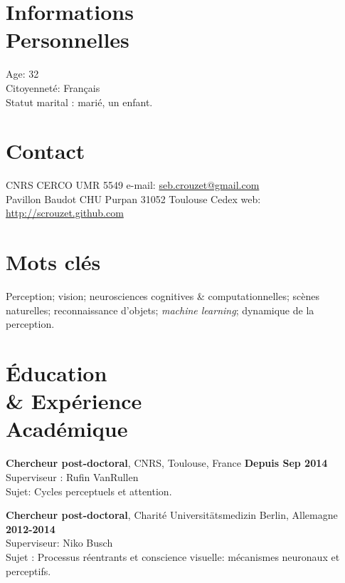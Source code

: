 \documentclass[margin,line]{resume}
\begin{document}
\begin{resume}

\section{\mysidestyle Informations\\Personnelles}
    Age: 32\\
    Citoyenneté: Français\\
    Statut marital : marié, un enfant.

\vspace{3mm}
\section{\mysidestyle Contact}
CNRS CERCO UMR 5549             \hfill e-mail: \href{mailto:seb.crouzet@gmail.com}{seb.crouzet@gmail.com} \\
Pavillon Baudot CHU Purpan 31052 Toulouse Cedex      \hfill web: \url{http://scrouzet.github.com} 
    

\vspace{3mm}
\section{\mysidestyle Mots clés}
    Perception; vision; neurosciences cognitives \& computationnelles; scènes naturelles; reconnaissance d'objets; \emph{machine learning}; dynamique de la perception.
    
\vspace{3mm}
\section{\mysidestyle \'Education \\ \& Expérience \\ Académique}
    
    
  \textbf{Chercheur post-doctoral}, CNRS, Toulouse, France \hfill \textbf{Depuis Sep 2014}\\
    	Superviseur : Rufin VanRullen\\
    	Sujet: Cycles perceptuels et attention.
    	\vspace{-1.5mm}
    
  \textbf{Chercheur post-doctoral}, Charité Universitätsmedizin Berlin, Allemagne \hfill \textbf{2012-2014}\\
	Superviseur: Niko Busch\\
	Sujet : Processus réentrants et conscience visuelle: mécanismes neuronaux et perceptifs.
	\vspace{-1.5mm}
	

\end{resume}
\end{document}
